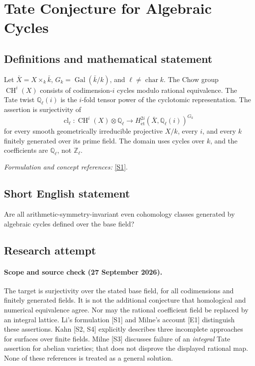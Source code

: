 \documentclass[11pt]{article}
\begin{document}
\section*{\texorpdfstring{Tate Conjecture for Algebraic Cycles}{Tate Conjecture for Algebraic Cycles}}\label{30006680}
\subsection{Definitions and mathematical statement}
Let $\bar X=X\times_k\bar k$, $G_k=\operatorname{Gal}(\bar k/k)$, and $\ell\ne\operatorname{char}k$. The Chow group $\operatorname{CH}^i(X)$ consists of codimension-$i$ cycles modulo rational equivalence. The Tate twist ${\mathbb{Q}}_\ell(i)$ is the $i$-fold tensor power of the cyclotomic representation. The assertion is surjectivity of
\[
 \operatorname{cl}_\ell:\operatorname{CH}^i(X)\otimes{\mathbb{Q}}_\ell
 \longrightarrow H^{2i}_{\mathrm{\acute et}}(\bar X,{\mathbb{Q}}_\ell(i))^{G_k}
\]
for every smooth geometrically irreducible projective $X/k$, every $i$, and every $k$ finitely generated over its prime field. The domain uses cycles over $k$, and the coefficients are ${\mathbb{Q}}_\ell$, not ${\mathbb{Z}}_\ell$.
\par\smallskip\textit{Formulation and concept references:} \href{https://www.math.columbia.edu/~chaoli/docs/TateConjecture.html}{[S1]}.

\subsection{Short English statement}
Are all arithmetic-symmetry-invariant even cohomology classes generated by algebraic cycles defined over the base field?
\subsection{Research attempt}

\paragraph{Scope and source check (27 September 2026).}
The target is surjectivity over the stated base field, for all codimensions
 and finitely generated fields. It is not the additional conjecture that
 homological and numerical equivalence agree. Nor may the rational
 coefficient field be replaced by an integral lattice. Li's formulation
 [S1] and Milne's account [E1] distinguish these assertions. Kahn [S2, S4]
 explicitly describes three incomplete approaches for surfaces over finite
 fields. Milne [S3] discusses failure of an \emph{integral} Tate assertion
 for abelian varieties; that does not disprove the displayed rational map.
 None of these references is treated as a general solution.
\end{document}
